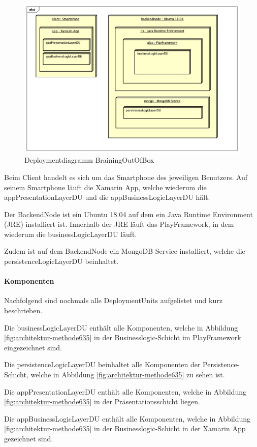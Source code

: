 \begin{figure}[h]
	\centering
	\includegraphics[width=1\linewidth]{img/deployment/DD_Methode635}
	\caption{Deploymentdiagramm BrainingOutOfBox}
	\label{fig:deployment-methode635}
\end{figure}

Beim Client handelt es sich um das Smartphone des jeweiligen Benutzers. Auf seinem Smartphone läuft die Xamarin App, welche wiederum die appPresentationLayerDU und die appBusinessLogicLayerDU hält.

Der BackendNode ist ein Ubuntu 18.04 auf dem ein Java Runtime Environment (JRE) installiert ist. Innerhalb der JRE läuft das PlayFramework, in dem wiederum die businessLogicLayerDU läuft.

Zudem ist auf dem BackendNode ein MongoDB Service installiert, welche  die persistenceLogicLayerDU beinhaltet.

\paragraph*{Komponenten}
Nachfolgend sind nochmals alle DeploymentUnits aufgelistet und kurz beschrieben.
\begin{description}[leftmargin=!,labelwidth=\widthof{\bfseries appBusinessLogicLayerDU}]
	\item[businessLogicLayerDU] Die businessLogicLayerDU enthält alle Komponenten, welche in Abbildung \ref{fig:architektur-methode635} in der Businesslogic-Schicht im PlayFramework eingezeichnet sind.
	\item[persistenceLogicLayerDU] Die persistenceLogicLayerDU beinhaltet alle Komponenten der Persistence-Schicht, welche in Abbildung \ref{fig:architektur-methode635} zu sehen ist.
	\item[appPresentationLayerDU] Die appPresentationLayerDU enthält alle Komponenten, welche in Abbildung \ref{fig:architektur-methode635} in der Präsentationsschicht liegen.
	\item[appBusinessLogicLayerDU] Die appBusinessLogicLayerDU enthält alle Komponenten, welche in Abbildung \ref{fig:architektur-methode635} in der Businesslogic-Schicht in der Xamarin App gezeichnet sind.
\end{description}